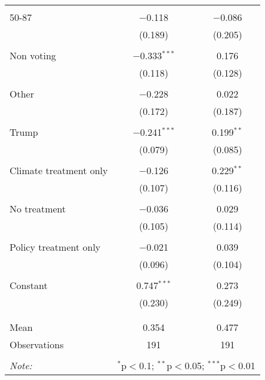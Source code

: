 \begin{tabular}{@{\extracolsep{5pt}}lcc}
  & & \\ 
 50-87 & $-$0.118 & $-$0.086 \\ 
  & (0.189) & (0.205) \\ 
  & & \\ 
 Non voting & $-$0.333$^{***}$ & 0.176 \\ 
  & (0.118) & (0.128) \\ 
  & & \\ 
 Other & $-$0.228 & 0.022 \\ 
  & (0.172) & (0.187) \\ 
  & & \\ 
 Trump & $-$0.241$^{***}$ & 0.199$^{**}$ \\ 
  & (0.079) & (0.085) \\ 
  & & \\ 
 Climate treatment only & $-$0.126 & 0.229$^{**}$ \\ 
  & (0.107) & (0.116) \\ 
  & & \\ 
 No treatment & $-$0.036 & 0.029 \\ 
  & (0.105) & (0.114) \\ 
  & & \\ 
 Policy treatment only & $-$0.021 & 0.039 \\ 
  & (0.096) & (0.104) \\ 
  & & \\ 
 Constant & 0.747$^{***}$ & 0.273 \\ 
  & (0.230) & (0.249) \\ 
  & & \\ 
\hline \\[-1.8ex] 
Mean & 0.354 & 0.477 \\ 
Observations & 191 & 191 \\ 
\hline 
\hline \\[-1.8ex] 
\textit{Note:}  & \multicolumn{2}{r}{$^{*}$p$<$0.1; $^{**}$p$<$0.05; $^{***}$p$<$0.01} \\ 
\end{tabular} 
